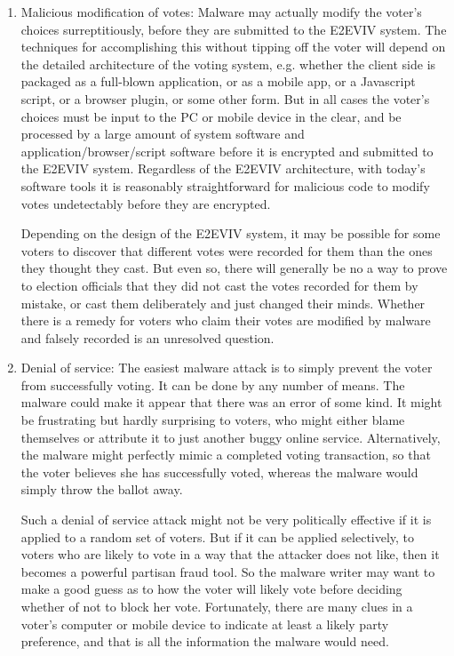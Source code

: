 \begin{enumerate}[label={\roman*})]
\item Malicious modification of votes: Malware may actually modify the
  voter's choices surreptitiously, before they are submitted to the
  E2EVIV system. The techniques for accomplishing this without tipping
  off the voter will depend on the detailed architecture of the voting
  system, e.g. whether the client side is packaged as a full-blown
  application, or as a mobile app, or a Javascript script, or a
  browser plugin, or some other form. But in all cases the voter's
  choices must be input to the PC or mobile device in the clear, and
  be processed by a large amount of system software and
  application/browser/script software before it is encrypted and
  submitted to the E2EVIV system. Regardless of the E2EVIV
  architecture, with today's software tools it is reasonably
  straightforward for malicious code to modify votes undetectably
  before they are encrypted.

  Depending on the design of the E2EVIV system, it may be possible for
  some voters to discover that different votes were recorded for them
  than the ones they thought they cast. But even so, there will
  generally be no a way to prove to election officials that they did
  not cast the votes recorded for them by mistake, or cast them
  deliberately and just changed their minds. Whether there is a remedy
  for voters who claim their votes are modified by malware and falsely
  recorded is an unresolved question.  

\item Denial of service: The easiest malware attack is to simply
  prevent the voter from successfully voting. It can be done by any
  number of means. The malware could make it appear that there was an
  error of some kind. It might be frustrating but hardly surprising to
  voters, who might either blame themselves or attribute it to just
  another buggy online service. Alternatively, the malware might
  perfectly mimic a completed voting transaction, so that the voter
  believes she has successfully voted, whereas the malware would
  simply throw the ballot away.

  Such a denial of service attack might not be very politically
  effective if it is applied to a random set of voters.  But if it can
  be applied selectively, to voters who are likely to vote in a way
  that the attacker does not like, then it becomes a powerful partisan
  fraud tool.  So the malware writer may want to make a good guess as
  to how the voter will likely vote before deciding whether of not to
  block her vote.  Fortunately, there are many clues in a voter's
  computer or mobile device to indicate at least a likely party
  preference, and that is all the information the malware would need.


\end{enumerate}
